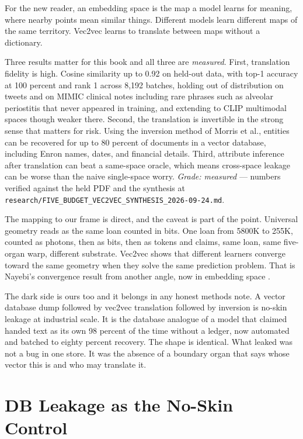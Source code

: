 For the new reader, an embedding space is the map a model learns for meaning, where nearby points mean similar things. Different models learn different maps of the same territory. Vec2vec learns to translate between maps without a dictionary.

Three results matter for this book and all three are \textit{measured}. First, translation fidelity is high. Cosine similarity up to 0.92 on held-out data, with top-1 accuracy at 100 percent and rank 1 across 8,192 batches, holding out of distribution on tweets and on MIMIC clinical notes including rare phrases such as alveolar periostitis that never appeared in training, and extending to CLIP multimodal spaces though weaker there. Second, the translation is invertible in the strong sense that matters for risk. Using the inversion method of Morris et al., entities can be recovered for up to 80 percent of documents in a vector database, including Enron names, dates, and financial details. Third, attribute inference after translation can beat a same-space oracle, which means cross-space leakage can be worse than the naive single-space worry. \textit{Grade: measured} --- numbers verified against the held PDF and the synthesis at \texttt{research/FIVE\_BUDGET\_VEC2VEC\_SYNTHESIS\_2026-09-24.md}.

The mapping to our frame is direct, and the caveat is part of the point. Universal geometry reads as the same loan counted in bits. One loan from 5800K to 255K, counted as photons, then as bits, then as tokens and claims, same loan, same five-organ warp, different substrate. Vec2vec shows that different learners converge toward the same geometry when they solve the same prediction problem. That is Nayebi's convergence result from another angle, now in embedding space \citep{nayebi2026}.

The dark side is ours too and it belongs in any honest methods note. A vector database dump followed by vec2vec translation followed by inversion is no-skin leakage at industrial scale. It is the database analogue of a model that claimed handed text as its own 98 percent of the time without a ledger, now automated and batched to eighty percent recovery. The shape is identical. What leaked was not a bug in one store. It was the absence of a boundary organ that says whose vector this is and who may translate it.

\section{DB Leakage as the No-Skin Control}
\label{sec:ch09-noskin}

